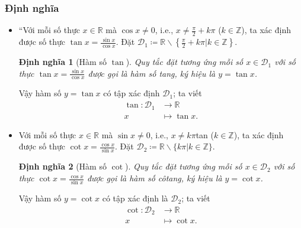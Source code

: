 \documentclass[oneside]{book}
\numberwithin{equation}{section}
\newtheorem{dinhnghia}{Định nghĩa}[section]
\begin{document}
\subsubsection{Định nghĩa}
\begin{itemize}
	\item ``Với mỗi số thực $x\in\mathbb{R}$ mà $\cos x\ne 0$, i.e., $x\ne\frac{\pi}{2} + k\pi$ ($k\in\mathbb{Z}$), ta xác định được số thực $\tan x = \frac{\sin x}{\cos x}$. Đặt $\mathcal{D}_1\coloneqq\mathbb{R}\backslash\left\{\frac{\pi}{2} + k\pi|k\in\mathbb{Z}\right\}$.
	
	\begin{dinhnghia}[Hàm số $\tan$]
		Quy tắc đặt tương ứng mỗi số $x\in\mathcal{D}_1$ với số thực $\tan x = \frac{\sin x}{\cos x}$ được gọi là \emph{hàm số tang}, ký hiệu là $y = \tan x$.
	\end{dinhnghia}
	Vậy hàm số $y = \tan x$ có tập xác định $\mathcal{D}_1$; ta viết
	\begin{align*}
		\tan:\mathcal{D}_1&\to\mathbb{R}\\
		x&\mapsto\tan x.
	\end{align*}
	\item Với mỗi số thực $x\in\mathbb{R}$ mà $\sin x\ne 0$, i.e., $x\ne k\pi$tan ($k\in\mathbb{Z}$), ta xác định được số thực $\cot x = \frac{\cos x}{\sin x}$. Đặt $\mathcal{D}_2\coloneqq\mathbb{R}\backslash\{k\pi|k\in\mathbb{Z}\}$.
	
	\begin{dinhnghia}[Hàm số $\cot$]
		Quy tắc đặt tương ứng mỗi số $x\in\mathcal{D}_2$ với số thực $\cot x = \frac{\cos x}{\sin x}$ được gọi là \emph{hàm số côtang}, ký hiệu là $y = \cot x$.
	\end{dinhnghia}
	Vậy hàm số $y = \cot x$ có tập xác định là $\mathcal{D}_2$; ta viết
	\begin{align*}
		\cot:\mathcal{D}_2&\to\mathbb{R}\\
		x&\mapsto\cot x.
	\end{align*}
	

\end{itemize}
\end{document}
